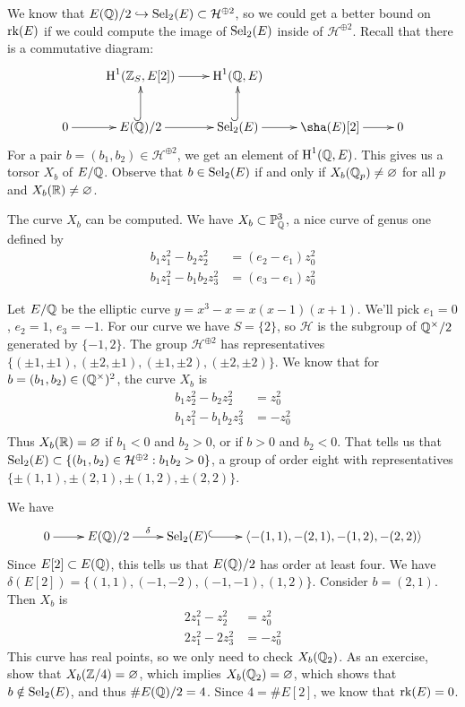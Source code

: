 \documentclass{article}
\begin{document}
\begin{example}[descent]
We know that $E(\mathbb{Q})/2\hookrightarrow \operatorname{Sel}_2(E)\subset \mathcal H^{\oplus 2}$, 
so we could get a better bound on $\operatorname{rk}(E)$ if we could compute 
the image of $\operatorname{Sel}_2(E)$ inside of $\mathcal H^{\oplus 2}$. Recall that there 
is a commutative diagram:
\[\xymatrix{
  & \h^1(\dZ_S,E[2]) \ar[r] 
    & \h^1(\dQ,E) \\
  0 \ar[r] 
    & E(\dQ)/2 \ar[r] \ar@{^{(}->}[u] 
    & \sel_2(E) \ar[r] \ar@{^{(}->}[u] 
    & \sha(E)[2] \ar[r]
    & 0
}\]
For a pair $b=(b_1,b_2)\in \mathcal H^{\oplus 2}$, we get an element of 
$\operatorname{H}^1(\mathbb{Q},E)$. This gives us a torsor $X_b$ of $E/\mathbb{Q}$. Observe that 
$b\in \operatorname{Sel}_2(E)$ if and only if $X_b(\mathbb{Q}_p)\ne \varnothing$ for all $p$ and 
$X_b(\mathbb{R})\ne\varnothing$. 

The curve $X_b$ can be computed. We have $X_b\subset \mathbb{P}_{\mathbb{Q}}^3$, a nice curve 
of genus one defined by 
\begin{align*}
  b_1 z_1^2 - b_2 z_2^2 &= (e_2-e_1)z_0^2 \\
  b_1 z_1^2 - b_1 b_2 z_3^2 &= (e_3 -e_1) z_0^2
\end{align*}
\end{example}

\begin{example}
Let $E/\mathbb{Q}$ be the elliptic curve $y=x^3-x=x(x-1)(x+1)$. We'll pick 
$e_1=0$, $e_2=1$, $e_3=-1$. For our curve we have $S=\{2\}$, so $\mathcal H$ is 
the subgroup of $\mathbb{Q}^\times/2$ generated by $\{-1,2\}$. The group 
$\mathcal H^{\oplus 2}$ has representatives 
$\{(\pm 1,\pm 1),(\pm 2,\pm 1),(\pm 1,\pm 2),(\pm 2,\pm 2)\}$. We know that for 
$b=(b_1,b_2)\in (\mathbb{Q}^\times)^2$, the curve $X_b$ is 
\begin{align*}
  b_1 z_2^2 - b_2 z_2^2 &= z_0^2 \\
  b_1 z_1^2 - b_1 b_2 z_3^2&=-z_0^2 \\
\end{align*}
Thus $X_b(\mathbb{R})=\varnothing$ if $b_1<0$ and $b_2>0$, or if 
$b>0$ and $b_2<0$. That tells us that 
$\operatorname{Sel}_2(E)\subset \{(b_1,b_2)\in \mathcal H^{\oplus 2}:b_1 b_2>0\}$, a group of 
order eight with representatives $\{\pm (1,1),\pm (2,1),\pm (1,2),\pm (2,2)\}$. 

We have 
\[\xymatrix{
  0 \ar[r] 
    & E(\dQ)/2 \ar[r]^-\delta 
    & \sel_2(E) \ar@{^{(}->}[r] 
    & \langle-(1,1),-(2,1),-(1,2),-(2,2)\rangle
}\]
Since $E[2]\subset E(\mathbb{Q})$, this tells us that $E(\mathbb{Q})/2$ has order at least 
four. We have $\delta(E[2])=\{(1,1),(-1,-2),(-1,-1),(1,2)\}$. Consider 
$b=(2,1)$. Then $X_b$ is 
\begin{align*}
  2 z_1^2 - z_2^2 &= z_0^2 \\
  2 z_1^2 - 2 z_3^2 &= -z_0^2
\end{align*}
This curve has real points, so we only need to check $X_b(\mathbb{Q}_2)$. As an 
exercise, show that $X_b(\mathbb{Z}/4)=\varnothing$, which implies 
$X_b(\mathbb{Q}_2)=\varnothing$, which shows that $b\notin \operatorname{Sel}_2(E)$, and thus 
$\# E(\mathbb{Q})/2=4$. Since $4=\# E[2]$, we know that $\operatorname{rk}(E)=0$. 
\end{example}
\end{document}
